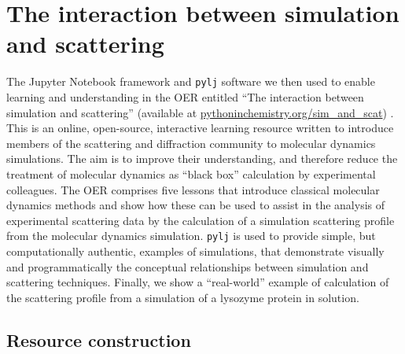 \section{The interaction between simulation and scattering}
\label{sec:sim_and_scat}

The Jupyter Notebook framework and \texttt{pylj} software we then used to enable learning and understanding in the OER entitled ``The interaction between simulation and scattering'' (available at \href{https://pythoninchemistry.org/sim_and_scat}{pythoninchemistry.org/sim\_and\_scat}) \cite{mccluskey_pythoninchemistry/sim_and_scat_2019}.
This is an online, open-source, interactive learning resource written to introduce members of the scattering and diffraction community to molecular dynamics simulations.
The aim is to improve their understanding, and therefore reduce the treatment of molecular dynamics as ``black box'' calculation by experimental colleagues.
The OER comprises five lessons that introduce classical molecular dynamics methods and show how these can be used to assist in the analysis of experimental scattering data by the calculation of a simulation scattering profile from the molecular dynamics simulation.
\texttt{pylj} is used to provide simple, but computationally authentic, examples of simulations, that demonstrate visually and programmatically the conceptual relationships between simulation and scattering techniques.
Finally, we show a ``real-world'' example of calculation of the scattering profile from a simulation of a lysozyme protein in solution.

\subsection{Resource construction}

